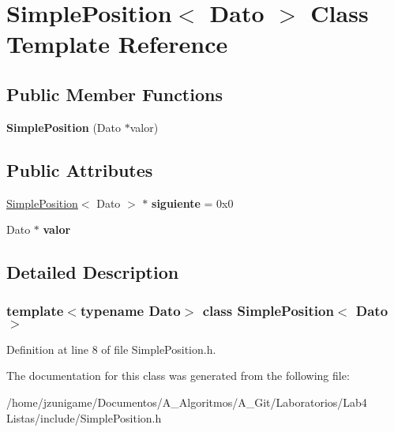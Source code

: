 \hypertarget{class_simple_position}{}\section{Simple\+Position$<$ Dato $>$ Class Template Reference}
\label{class_simple_position}
\subsection*{Public Member Functions}
\begin{DoxyCompactItemize}
\item 
\mbox{\label{class_simple_position_a6b6e102942c3cf1797735255897402b5}} 
{\bfseries Simple\+Position} (Dato $\ast$valor)
\end{DoxyCompactItemize}
\subsection*{Public Attributes}
\begin{DoxyCompactItemize}
\item 
\mbox{\label{class_simple_position_a65bb8d8c8a3011fb28ea1a324c7910dc}} 
\hyperlink{class_simple_position}{Simple\+Position}$<$ Dato $>$ $\ast$ {\bfseries siguiente} = 0x0
\item 
\mbox{\label{class_simple_position_adfc8434ef460d5c20d71494ad6a48c52}} 
Dato $\ast$ {\bfseries valor}
\end{DoxyCompactItemize}


\subsection{Detailed Description}
\subsubsection*{template$<$typename Dato$>$\newline
class Simple\+Position$<$ Dato $>$}



Definition at line 8 of file Simple\+Position.\+h.



The documentation for this class was generated from the following file\+:\begin{DoxyCompactItemize}
\item 
/home/jzunigame/\+Documentos/\+A\+\_\+\+Algoritmos/\+A\+\_\+\+Git/\+Laboratorios/\+Lab4 Listas/include/Simple\+Position.\+h\end{DoxyCompactItemize}
